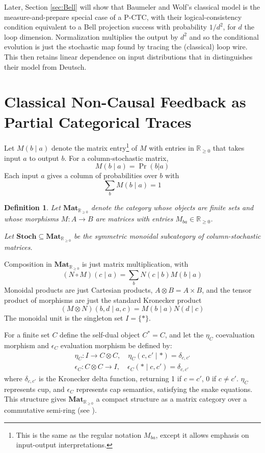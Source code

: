 \documentclass[10pt, a4paper]{article}
\newcommand{\Mat}[0]{\mathbf{Mat}_{\mathbb{R}_{\geq 0}}}
\newtheorem{definition}{Definition}
\begin{document}
Later, Section \ref{sec:Bell} will show that Baumeler and Wolf's classical model is the measure-and-prepare special case of a P-CTC, with their logical-consistency condition equivalent to a Bell projection success with probability $1/d^2$, for $d$ the loop dimension. Normalization multiplies the output by $d^2$ and so the conditional evolution is just the stochastic map found by tracing the (classical) loop wire. This then retains linear dependence on input distributions that in \cite[\S 6]{BaumelerWolf2017} distinguishes their model from Deutsch.

\section{Classical Non-Causal Feedback as Partial Categorical Traces}

Let $M(b \mid a)$ denote the matrix entry\footnote{This is the same as the regular notation $M_{ba}$, except it allows emphasis on input-output interpretations.} of $M$ with entries in $\mathbb{R}_{\geq 0}$ that takes input $a$ to output $b$. For a column-stochastic matrix, $$ M(b \mid a) = \Pr(b | a) $$ Each input $a$ gives a column of probabilities over $b$ with $$ \sum_b M(b \mid a) = 1 $$

\begin{definition}
    Let $\mathbf{Mat}_{\mathbb{R}_{\geq 0}}$ denote the category whose objects are finite sets and whose morphisms $M : A \rightarrow B$ are matrices with entries $M_{ba} \in \mathbb{R}_{\geq 0}$. 
    
    Let \emph{$\mathbf{Stoch} \subseteq \mathbf{Mat}_{\mathbb{R}_{\geq 0}}$} be the symmetric monoidal subcategory of column-stochastic matrices.
\end{definition}

Composition in $\Mat$ is just matrix multiplication, with $$ (N \circ M)(c \mid a) = \sum_b N(c \mid b)M(b \mid a) $$ Monoidal products are just Cartesian products, $A \otimes B = A \times B$, and the tensor product of morphisms are just the standard Kronecker product $$ (M \otimes N)(b,d \mid a,c) = M(b \mid a)N(d \mid c) $$ The monoidal unit is the singleton set $I = \{ * \}$.

For a finite set $C$ define the self-dual object $C^* = C$, and let the $\eta_C$ coevaluation morphism and $\epsilon_C$ evaluation morphism be defined by:
\begin{align*}
    \eta_C : I \rightarrow C \otimes C, \quad \eta_C(c, c' \mid *) = \delta_{c,c'} \\
    \epsilon_C : C \otimes C \rightarrow I, \quad \epsilon_C(* \mid c,c') = \delta_{c,c'}
\end{align*} where $\delta_{c,c'}$ is the Kronecker delta function, returning 1 if $c = c'$, 0 if $c \neq c'$. $\eta_C$ represents cup, and $\epsilon_C$ represents cap semantics, satisfying the snake equations. This structure gives $\mathbf{Mat}_{\mathbb{R}_{\geq 0}}$ a compact structure as a matrix category over a commutative semi-ring (see \cite{Coecke2017-kx}). 
\end{document}
